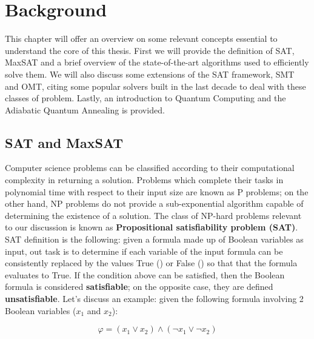 \chapter{Background}
\label{cha:introQA}

This chapter will offer an overview on some relevant concepts essential to understand the core of this thesis. First we will provide the definition of SAT, MaxSAT and a brief overview of the state-of-the-art algorithms used to efficiently solve them. We will also discuss some extensions of the SAT framework, SMT and OMT, citing some popular solvers built in the last decade to deal with these classes of problem. Lastly, an introduction to Quantum Computing and the Adiabatic Quantum Annealing is provided.

\section{SAT and MaxSAT}
\label{sec:satmaxsat}

Computer science problems can be classified according to their computational complexity in returning a solution. Problems which complete their tasks in polynomial time with respect to their input size are known as P problems; on the other hand, NP problems do not provide a sub-exponential algorithm capable of determining the existence of a solution. The class of NP-hard problems relevant to our discussion is known as \textbf{Propositional satisfiability problem (SAT)}. \\
SAT definition is the following: given a formula made up of Boolean variables as input, out task is to determine if each variable of the input formula can be consistently replaced by the values True () or False () so that that the formula evaluates to True. If the condition above can be satisfied, then the Boolean formula is considered \textbf{satisfiable}; on the opposite case, they are defined \textbf{unsatisfiable}. Let's discuss an example: given the following formula involving 2 Boolean variables ($x_1$ and $x_2$):

\begin{equation}
    \varphi = ( x_1 \vee x_2) \wedge (\neg x_1 \vee \neg x_2)
\end{equation}

